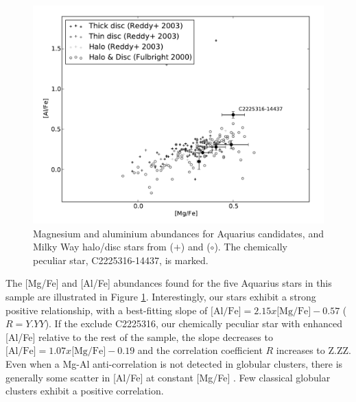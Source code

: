 \documentclass{emulateapj}
\begin{document}



\begin{figure}[h!]
	\includegraphics[width=\columnwidth]{./figures/aquarius-mg-al.pdf}
	\caption{Magnesium and aluminium abundances for Aquarius candidates, and Milky Way halo/disc stars from \citet{reddy;et-al_2003} ($+$) and \citet{fulbright_2000} ($\circ$). The chemically peculiar star, C2225316-14437, is marked.}
	\label{fig:mg-al}
\end{figure}



The [Mg/Fe] and [Al/Fe] abundances found for the five Aquarius stars in this sample are illustrated in Figure \ref{fig:mg-al}. Interestingly, our stars exhibit a strong positive relationship, with a best-fitting slope of $\mbox{[Al/Fe]} = 2.15 x \mbox{[Mg/Fe]} - 0.57$ ($R = Y.YY$). If the exclude C2225316, our chemically peculiar star with enhanced [Al/Fe] relative to the rest of the sample, the slope decreases to $\mbox{[Al/Fe]} = 1.07 x \mbox{[Mg/Fe]} - 0.19$ and the correlation coefficient $R$ increases to Z.ZZ. Even when a Mg-Al anti-correlation is not detected in globular clusters, there is generally some scatter in [Al/Fe] at constant [Mg/Fe] \citet[e.g. see][]{carretta;et-al_2009a}. Few classical globular clusters exhibit a positive correlation.
\end{document}
